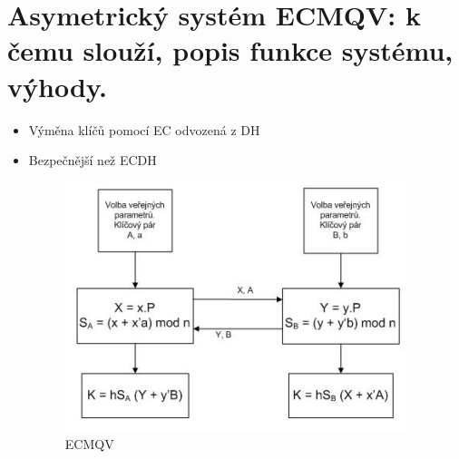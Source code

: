 \section{Asymetrický systém ECMQV: k čemu slouží, popis funkce systému, výhody.}
\begin{itemize}
    \item Výměna klíčů pomocí EC odvozená z DH
    \item Bezpečnější než ECDH
    \begin{figure}[h!]
        \centering
        \includegraphics[width=0.5\linewidth]{images/ECMQV.png}
        \caption{ECMQV}
        \label{fig:enter-label}
    \end{figure}
\end{itemize}
